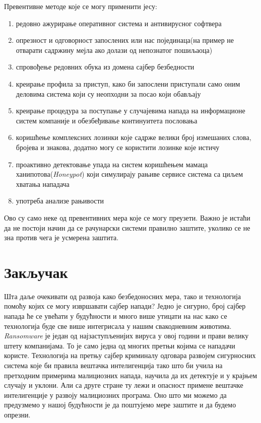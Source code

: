 \documentclass[a4paper]{article}
\begin{document}
	Превентивне методе које се могу применити јесу\cite{zastita1}\cite{zastita2}:
	\begin{enumerate}
		\item редовно ажурирање оперативног система и антивирусног софтвера
		\item опрезност и одговорност запослених или нас појединаца(на пример не отварати садржину мејла ако долази од непознатог пошиљаоца)
		\item спровођење редовних обука из домена сајбер безбедности 
		\item креирање профила за приступ, како би запослени приступали само оним деловима система који су неопходни за посао који обављају 
		\item креирање процедура за поступање у случајевима напада на инфор\-мационе систем компаније и обезбеђивање континуитета пословања 
		\item коришћење комплексних лозинки које садрже велики број измеша\-них слова, бројева и знакова, додатно могу се користити лозинке које истичу 			
		\item проактивно детектовање упада на систем коришћењем мамаца ханипотова({\em Honeypot})\cite{hanipot} који симулирају рањиве сервисе система са циљем хватања нападача 
		\item употреба анализе рањивости 
	\end{enumerate}
	
	Ово су само неке од превентивних мера које се могу преузети. Важно је истаћи да не постоји начин да се рачунарски системи правилно заштите, уколико се не зна против чега је усмерена заштита.
	\section{Закључак}
	\label{sec:Zakljucak}
	Шта даље очекивати од развоја како безбедоносних мера, тако и технологија помоћу којих се могу извршавати сајбер напади? Једно је сигурно, број сајбер напада ће се увећати у будућности и много више утицати на нас како се технологија буде све више интегрисала у нашим свакодневним животима. {\em Ransomware} је један од најзаступљени\-јих вируса у овој години и прави велику штету компанијама. То је само једна од многих претњи којима се нападачи користе. Технологија на претњу сајбер криминалу одговара развојем сигурносних система које би правила вештачка интелигенција тако што би учила на претходним примерима малициозних напада, научила да их детектује и у крајњем случају и уклони\cite{AIsecurity}. Али са друге стране ту лежи и опасност примене вештачке интелигенције у развоју малициозних програма. Оно што ми можемо да предузмемо у нашој будућности је да поштујемо мере заштите и да будемо опрезни. 
\end{document}
